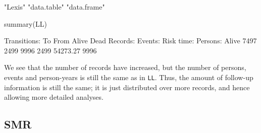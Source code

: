 \begin{enumerate}
\begin{Schunk}
\begin{Soutput}
[1] "Lexis"      "data.table" "data.frame"
\end{Soutput}
\begin{Sinput}
 summary(LL)
\end{Sinput}
\begin{Soutput}
Transitions:
     To
From    Alive Dead  Records:  Events: Risk time:  Persons:
  Alive  7497 2499      9996     2499   54273.27      9996
\end{Soutput}
\end{Schunk}
We see that the number of records have increased, but the number of
persons, events and person-years is still the same as in
\texttt{LL}. Thus, the amount of follow-up information is still the
same; it is just distributed over more records, and hence allowing
more detailed analyses.

\end{enumerate}

\subsection*{SMR}




